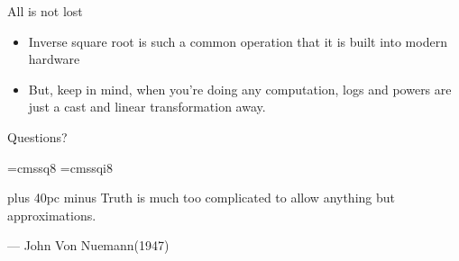 \documentclass[aspectratio=169]{beamer}
\begin{document}
\begin{frame}{All is not lost}
    \begin{itemize}
        \item Inverse square root is such a common operation that it is built into modern hardware \pause 
        \item But, keep in mind, when you're doing any computation, logs and powers are just a cast and linear transformation away. 
    \end{itemize}
\end{frame}

\begin{frame}{}
      \begin{center}
    {\color{sigma@mainblue} \LARGE Questions?}
  \end{center}
\end{frame}


\font\eightss=cmssq8
\font\eightssi=cmssqi8
\newcommand\quoteAuthorDate[3]{\begingroup
  \baselineskip 10pt
  \parfillskip 0pt
  \interlinepenalty 10000 %
  \leftskip 0pt plus 40pc minus \parindent
  \let\rm=\eightss
  \let\sl=\eightssi
  \everypar{\sl}#1\par
  \nobreak\smallskip
  \noindent\rm--- #2\unskip\enspace(#3)\par
  \endgroup}
\begin{frame}
    \begin{center}
        \item \quoteAuthorDate{Truth is much too complicated to allow anything but approximations.}{John Von Nuemann}{\textcolor{sigma@mainblue}{1947}}
    \end{center}
\end{frame}

\end{document}
